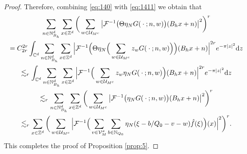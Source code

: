 \documentclass[a4paper,oneside]{amsart}
\theoremstyle{plain}
\theoremstyle{definition}
\numberwithin{equation}{section}
\theoremstyle{plain}
\newcommand{\ZZ}{\mathbb{Z}}
\newcommand{\CC}{\mathbb{C}}
\newcommand{\NN}{\mathbb{N}}
\newcommand{\calF}{\mathcal{F}}
\newcommand{\8}{\infty}
\begin{document}
\begin{proof}
Therefore, combining \eqref{eq:140} with \eqref{eq:1411} we obtain that
\begin{multline}
  \label{eq:142}
\sum_{n\in \NN_{B_h}^d}\sum_{x\in\ZZ^d}\bigg(\sum_{w\in\mathcal
  U_{M^c}}\big|\calF^{-1}\big(\Theta\eta_N G(\: \cdot\: ;n, w)\big)(B_hx+n)\big|^2\bigg)^r
\\=C_{2r}^{2r}\int_{\CC^d}
\sum_{n\in \NN_{B_h}^d}\sum_{x\in\ZZ^d}\Big|\calF^{-1}\Big(\Theta\eta_N\Big(\sum_{w\in\mathcal
	U_{M^c}}z_{w} G(\: \cdot\: ;n, w)\Big)\Big)(B_hx+n)\Big|^{2r}e^{-\pi |z|^2}{\rm d}z\\
\lesssim_r\int_{\CC^d}
\sum_{n\in \NN_{B_h}^d}\sum_{x\in\ZZ^d}\Big|\calF^{-1}\Big(\sum_{w\in\mathcal
	U_{M^c}}z_{w} \eta_NG(\: \cdot\: ;n, w)\Big)(B_hx+n)\Big|^{2r}e^{-\pi |z|^2}{\rm d}z\\
\lesssim_r\sum_{n\in \NN_{B_h}^d}\sum_{x\in\ZZ^d}\bigg(\sum_{w\in\mathcal
  U_{M^c}}\big|\calF^{-1}\big(\eta_N G(\: \cdot\: ;n, w)\big)(B_hx+n)\big|^2\bigg)^r\\
\lesssim_r\sum_{x\in\ZZ^d}\bigg(\sum_{w\in\mathcal
  U_{M^c}}\Big|\calF^{-1}\Big(\sum_{v\in\mathcal V_{M}^{\sigma}}\sum_{b\in\NN_{Q_0}}\eta_N(\xi-b/Q_0-v-w)\hat{f}(\xi)\Big)(x)\Big|^2\bigg)^r.
\end{multline}
This completes the proof of Proposition \ref{prop:5}.
\end{proof}
\end{document}
